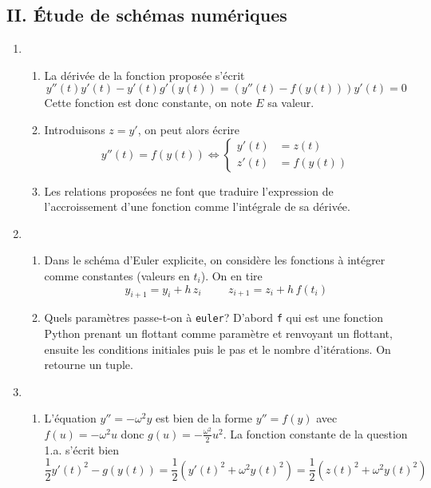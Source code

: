 \subsection*{II. \'Etude de schémas numériques}
\begin{enumerate}
  \item 
\begin{enumerate}
  \item La dérivée de la fonction proposée s'écrit
\begin{displaymath}
  y''(t)y'(t) -y'(t)g'(y(t)) = \left( y''(t) -f(y(t))\right)y'(t) = 0  
\end{displaymath}
Cette fonction est donc constante, on note $E$ sa valeur.
  \item Introduisons $z=y'$, on peut alors écrire
\begin{displaymath}
y''(t) = f(y(t))\Leftrightarrow
\left\lbrace 
\begin{aligned}
  y'(t) &= z(t) \\ z'(t) &= f(y(t))
\end{aligned}
\right. 
\end{displaymath}

  \item Les relations proposées ne font que traduire l'expression de l'accroissement d'une fonction comme l'intégrale de sa dérivée.
\end{enumerate}

  \item 
\begin{enumerate}
  \item Dans le schéma d'Euler explicite, on considère les fonctions à intégrer comme constantes (valeurs en $t_i$). On en tire
\begin{displaymath}
  y_{i+1} = y_i + h\,z_i \hspace{1cm} z_{i+1} = z_i + h\,f(t_i)
\end{displaymath}

  \item Quels paramètres passe-t-on à \texttt{euler}? D'abord \texttt{f} qui est une fonction Python prenant un flottant comme paramètre et renvoyant un flottant, ensuite les conditions initiales puis le pas et le nombre d'itérations. On retourne un tuple.
  
\end{enumerate}

  \item
\begin{enumerate}
  \item L'équation $y'' = -\omega^2 y$ est bien de la forme $y'' = f(y)$ avec $f(u)=-\omega^2 u$ donc $g(u)=-\frac{\omega^2}{2}u^2$. La fonction constante de la question 1.a. s'écrit bien 
\begin{displaymath}
  \frac{1}{2} y'(t)^2 -g(y(t)) = \frac{1}{2}\left( y'(t)^2 + \omega ^2y(t)^2\right) = \frac{1}{2}\left( z(t)^2 + \omega ^2y(t)^2\right) 
\end{displaymath}


\end{enumerate}
\end{enumerate}
